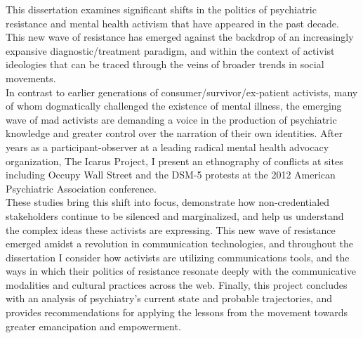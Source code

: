 %


\hfill
\vfill

\begingroup
\endgroup 

\bigskip


\begin{quoting}[indentfirst=false,leftmargin=3em]
	This dissertation examines significant shifts in the politics of psychiatric resistance and mental health activism that have appeared in the past decade. This new wave of resistance has emerged against the backdrop of an increasingly expansive diagnostic/treatment paradigm, and within the context of activist ideologies that can be traced through the veins of broader trends in social movements.\\

	\noindent
	In contrast to earlier generations of consumer/survivor/ex-patient activists, many of whom dogmatically challenged the existence of mental illness, the emerging wave of mad activists are demanding a voice in the production of psychiatric knowledge and greater control over the narration of their own identities. After years as a participant-observer at a leading radical mental health advocacy organization, The Icarus Project, I present an ethnography of conflicts at sites including Occupy Wall Street and the DSM-5 protests at the 2012 American Psychiatric Association conference.\\

	\noindent
	These studies bring this shift into focus, demonstrate how non-credentialed stakeholders continue to be silenced and marginalized, and help us understand the complex ideas these activists are expressing. This new wave of resistance emerged amidst a revolution in communication technologies, and throughout the dissertation I consider how activists are utilizing communications tools, and the ways in which their politics of resistance resonate deeply with the communicative modalities and cultural practices across the web. Finally, this project concludes with an analysis of psychiatry’s current state and probable trajectories, and provides recommendations for applying the lessons from the movement towards greater emancipation and empowerment.
\end{quoting}


